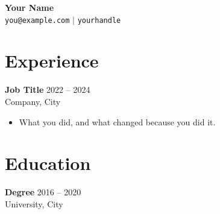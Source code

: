\documentclass[letterpaper,11pt]{article}
\begin{document}
\begin{center}
    \textbf{\Huge Your Name} \\
    \texttt{you@example.com} $|$ \texttt{yourhandle}
\end{center}

\section*{Experience}

\textbf{Job Title} \hfill 2022 -- 2024 \\
Company, City

\begin{itemize}
    \item What you did, and what changed because you did it.
\end{itemize}

\section*{Education}

\textbf{Degree} \hfill 2016 -- 2020 \\
University, City
\end{document}

